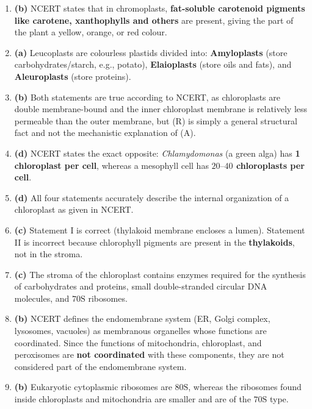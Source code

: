 \documentclass[11pt, a4paper]{article}
\begin{document}
\begin{enumerate}[label=\textbf{\arabic*.}, leftmargin=*, itemsep=6pt]
    \item \textbf{(b)} NCERT states that in chromoplasts, \textbf{fat-soluble carotenoid pigments like carotene, xanthophylls and others} are present, giving the part of the plant a yellow, orange, or red colour.

    \item \textbf{(a)} Leucoplasts are colourless plastids divided into: \textbf{Amyloplasts} (store carbohydrates/starch, e.g., potato), \textbf{Elaioplasts} (store oils and fats), and \textbf{Aleuroplasts} (store proteins).

    \item \textbf{(b)} Both statements are true according to NCERT, as chloroplasts are double membrane-bound and the inner chloroplast membrane is relatively less permeable than the outer membrane, but (R) is simply a general structural fact and not the mechanistic explanation of (A).

    \item \textbf{(d)} NCERT states the exact opposite: \textit{Chlamydomonas} (a green alga) has \textbf{1 chloroplast per cell}, whereas a mesophyll cell has \textbf{$20\text{--}40$ chloroplasts per cell}.

    \item \textbf{(d)} All four statements accurately describe the internal organization of a chloroplast as given in NCERT.

    \item \textbf{(c)} Statement I is correct (thylakoid membrane encloses a lumen). Statement II is incorrect because chlorophyll pigments are present in the \textbf{thylakoids}, not in the stroma.

    \item \textbf{(c)} The stroma of the chloroplast contains enzymes required for the synthesis of carbohydrates and proteins, small double-stranded circular DNA molecules, and $70\text{S}$ ribosomes.

    \item \textbf{(b)} NCERT defines the endomembrane system (ER, Golgi complex, lysosomes, vacuoles) as membranous organelles whose functions are coordinated. Since the functions of mitochondria, chloroplast, and peroxisomes are \textbf{not coordinated} with these components, they are not considered part of the endomembrane system.

    \item \textbf{(b)} Eukaryotic cytoplasmic ribosomes are \textbf{$80\text{S}$}, whereas the ribosomes found inside chloroplasts and mitochondria are smaller and are of the \textbf{$70\text{S}$} type.


\end{enumerate}
\end{document}
